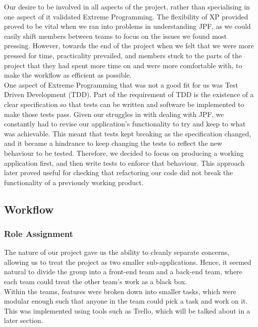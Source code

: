 \documentclass[titlepage,11pt]{article}
\begin{document}
Our desire to be involved in all aspects of the project, rather than specialising in one aspect of it validated Extreme Programming. The flexibility of XP provided proved to be vital when we ran into problems in understanding JPF, as we could easily shift members between teams to focus on the issues we found most pressing. However, towards the end of the project when we felt that we were more pressed for time, practicality prevailed, and members stuck to the parts of the project that they had spent more time on and were more comfortable with, to make the workflow as efficient as possible. \\

One aspect of Extreme Programming that was not a good fit for us was Test Driven Development (TDD). Part of the requirement of TDD is the existence of a clear specification so that tests can be written and software be implemented to make those tests pass. Given our struggles in with dealing with JPF, we constantly had to revise our application's functionality to try and keep to what was achievable. This meant that tests kept breaking as the specification changed, and it became a hindrance to keep changing the tests to reflect the new behaviour to be tested. Therefore, we decided to focus on producing a working application first, and then write tests to enforce that behaviour. This approach later proved useful for checking that refactoring our code did not break the functionality of a previously working product.

\subsection{Workflow}

\subsubsection{Role Assignment}

The nature of our project gave us the ability to cleanly separate concerns, allowing us to treat the project as two smaller sub-applications. Hence, it seemed natural to divide the group into a front-end team and a back-end team, where each team could treat the other team’s work as a black box. \\

Within the teams, features were broken down into smaller tasks, which were modular enough such that anyone in the team could pick a task and work on it. This was implemented using tools such as Trello, which will be talked about in a later section. \\
\end{document}
